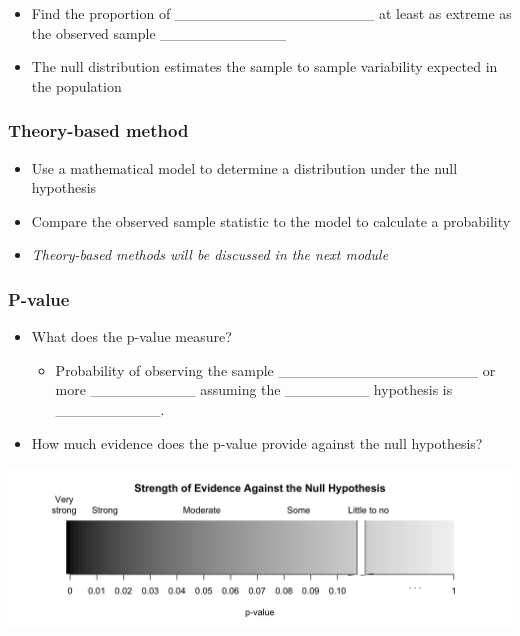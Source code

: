 \documentclass[
]{report}
\providecommand{\tightlist}{%
  \setlength{\itemsep}{0pt}\setlength{\parskip}{0pt}}
\begin{document}
\vspace{0.2in}

\begin{itemize}
\item
  Find the proportion of \_\_\_\_\_\_\_\_\_\_\_\_\_\_\_\_\_\_\_ at least as extreme as the observed sample \_\_\_\_\_\_\_\_\_\_\_\_
\item
  The null distribution estimates the sample to sample variability expected in the population
\end{itemize}


\subsubsection*{Theory-based method}\label{theory-based-method}

\begin{itemize}
\item
  Use a mathematical model to determine a distribution under the null hypothesis
\item
  Compare the observed sample statistic to the model to calculate a probability
\item
  \emph{Theory-based methods will be discussed in the next module}
\end{itemize}

\subsubsection*{P-value}\label{p-value}


\begin{itemize}
\item
  What does the p-value measure?

  \begin{itemize}
  \tightlist
  \item
    Probability of observing the sample \_\_\_\_\_\_\_\_\_\_\_\_\_\_\_\_\_\_\_ or more \_\_\_\_\_\_\_\_\_\_
    assuming the \_\_\_\_\_\_\_\_ hypothesis is \_\_\_\_\_\_\_\_\_\_.
  \end{itemize}
\item
  How much evidence does the p-value provide against the null hypothesis?
\end{itemize}

\begin{center}\includegraphics[width=0.75\linewidth]{images/soe_gradient_gray} \end{center}
\end{document}
